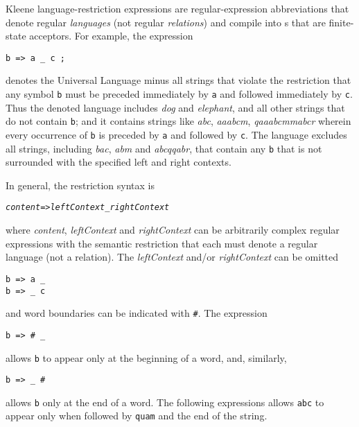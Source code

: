 Kleene language-restriction expressions are regular-expression
abbreviations that denote regular \emph{languages} (not regular
\emph{relations}) and compile into \fsm{}s that are finite-state
acceptors.  For
example, the expression

\begin{Verbatim}
b => a _ c ;
\end{Verbatim}

\noindent
denotes the Universal Language minus all strings that violate
the restriction that any symbol \texttt{b} must
be preceded immediately by \texttt{a} and followed immediately by
\texttt{c}.  Thus the denoted language includes \emph{dog} and
\emph{elephant}, and all other strings that do not contain
\texttt{b}; and it contains strings like \emph{abc}, \emph{aaabcm},
\emph{qaaabcmmabcr} wherein every occurrence of \texttt{b} is
preceded by \texttt{a} and followed by \texttt{c}.  The language
excludes all strings, including \emph{bac}, \emph{abm} and
\emph{abcqqabr}, that contain any \texttt{b} that is not surrounded
with the specified left and right contexts.

In general, the restriction syntax is

\begin{alltt}
\emph{content} => \emph{leftContext} _ \emph{rightContext}
\end{alltt}

\noindent
where \emph{content}, \emph{leftContext} and \emph{rightContext}
can be arbitrarily complex regular expressions with the semantic
restriction that each must denote a regular language (not a
relation).  The \emph{leftContext} and/or \emph{rightContext} can
be omitted

\begin{Verbatim}
b => a _
b => _ c
\end{Verbatim}

\noindent
and word boundaries can be indicated with \texttt{\#}.  The
expression

\begin{Verbatim}
b => # _
\end{Verbatim}

\noindent
allows \texttt{b} to appear only at the beginning of a word, and,
similarly,

\begin{Verbatim}
b => _ #
\end{Verbatim}

\noindent
allows \texttt{b} only at the end of a word.  The following
expressions allows \texttt{abc} to appear only when followed by
\texttt{quam} and the end of the string.

